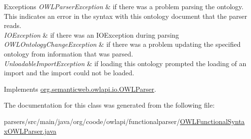 \begin{DoxyExceptions}{Exceptions}
{\em O\-W\-L\-Parser\-Exception} & if there was a problem parsing the ontology. This indicates an error in the syntax with this ontology document that the parser reads. \\
\hline
{\em I\-O\-Exception} & if there was an I\-O\-Exception during parsing \\
\hline
{\em O\-W\-L\-Ontology\-Change\-Exception} & if there was a problem updating the specified ontology from information that was parsed. \\
\hline
{\em Unloadable\-Import\-Exception} & if loading this ontology prompted the loading of an import and the import could not be loaded. \\
\hline
\end{DoxyExceptions}


Implements \hyperlink{interfaceorg_1_1semanticweb_1_1owlapi_1_1io_1_1_o_w_l_parser_a259739c6baf94f4e5a2dad5d0400f07a}{org.\-semanticweb.\-owlapi.\-io.\-O\-W\-L\-Parser}.



The documentation for this class was generated from the following file\-:\begin{DoxyCompactItemize}
\item 
parsers/src/main/java/org/coode/owlapi/functionalparser/\hyperlink{_o_w_l_functional_syntax_o_w_l_parser_8java}{O\-W\-L\-Functional\-Syntax\-O\-W\-L\-Parser.\-java}\end{DoxyCompactItemize}
